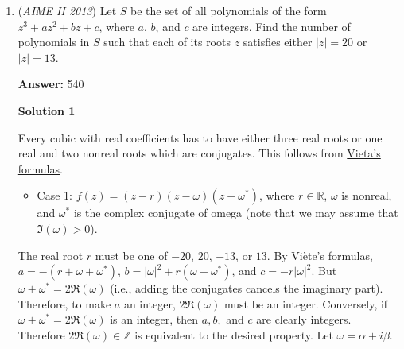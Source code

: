 \begin{enumerate}
 $\textbf{Case 4:} |R|=4$.

 There are $\binom{6}{3}$ ways to choose the other $3$ elements of $R$. WLOG, let these elements be $2, 3, 4$. We have $f(1)=f(2)=f(3)=f(4)=1$. For $e \in \{5, 6, 7\}$, if $f(e)=1$, then at least one of $2, 3, 4$ will not be included in the range of $f$. Therefore, each of $5, 6, 7$ must be mapped to a distinct element of $2, 3, 4$, so there are $3!$ ways to achieve this. Finally, the number of functions in this case is $\binom{6}{3}(3!)=120$.

 Finally, we add up all the cases to get $1057$ functions. However, this assumes $1$ is the constant value, but there are $7$ different possible constant values. Therefore, the final answer is $1057 \cdot 7 = 7399$ which when divided by $1000$ gives a remainder of $\boxed{399}$.

 


 


	\item (\textit{AIME II 2013}) Let $S$ be the set of all polynomials of the form $z^3 + az^2 + bz + c$, where $a$, $b$, and $c$ are integers. Find the number of polynomials in $S$ such that each of its roots $z$ satisfies either $|z| = 20$ or $|z| = 13$.


 
 \textbf{Answer: }540



\textbf{Solution 1}

Every cubic with real coefficients has to have either three real roots or one real and two nonreal roots which are conjugates. This follows from \href{https://artofproblemsolving.com/wiki/index.php?title=Vieta\%27s\_formulas}{Vieta's formulas}. 

 
            \begin{itemize}
        \item Case 1:  $f(z)=(z-r)(z-\omega)(z-\omega^*)$, where $r\in \mathbb{R}$,  $\omega$ is nonreal, and $\omega^*$ is the complex conjugate of omega (note that we may assume that $\Im(\omega)>0$).
            \end{itemize}
            The real root $r$ must be one of $-20$, $20$, $-13$, or $13$. By Viète's formulas, $a=-(r+\omega+\omega^*)$, $b=|\omega|^2+r(\omega+\omega^*)$, and $c=-r|\omega|^2$. But $\omega+\omega^*=2\Re{(\omega)}$ (i.e., adding the conjugates cancels the imaginary part). Therefore, to make $a$ an integer, $2\Re{(\omega)}$ must be an integer. Conversely, if $\omega+\omega^*=2\Re{(\omega)}$ is an integer, then $a,b,$ and $c$ are clearly integers. Therefore $2\Re{(\omega)}\in \mathbb{Z}$ is equivalent to the desired property. Let $\omega=\alpha+i\beta$.


\end{enumerate}
